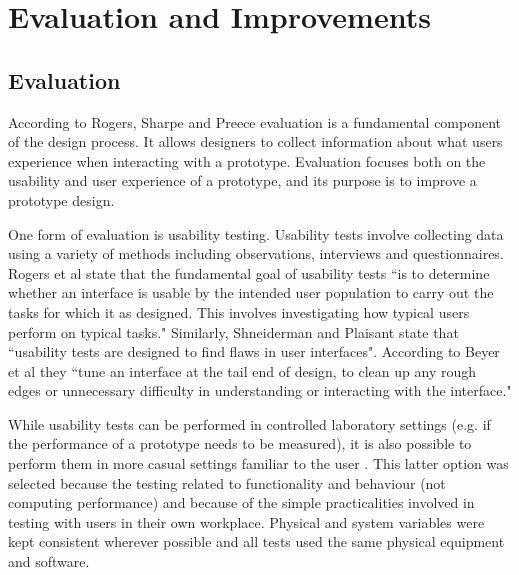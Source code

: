 
\chapter{Evaluation and Improvements} %

\label{Evaluation and Improvements} %



\section{Evaluation}
According to Rogers, Sharpe and Preece \citep[p. 433]{RogersPreece} evaluation is a fundamental component of the design process. It allows designers to collect information about what users experience when interacting with a prototype. Evaluation focuses both on the usability and user experience of a prototype, and its purpose is to improve a prototype design.

One form of evaluation is usability testing. Usability tests involve collecting data using a variety of methods including observations, interviews and questionnaires. Rogers et al \citep[p. 438]{RogersPreece}  state that the fundamental goal of usability tests ``is to determine whether an interface is usable by the intended user population to carry out the tasks for which it as designed. This involves investigating how typical users perform on typical tasks." Similarly, Shneiderman and Plaisant \citep[p. 144]{ShneidermanPlaisant} state that ``usability tests are designed to find flaws in user interfaces". According to Beyer et al \citep[p. 373]{BeyerHoltzblatt} they ``tune an interface at the tail end of design, to clean up any rough edges or unnecessary difficulty in understanding or interacting with the interface."

While usability tests can be performed in controlled laboratory settings (e.g. if the performance of a prototype needs to be measured), it is also possible to perform them in more casual settings familiar to the user \citep[p. 438]{RogersPreece}. This latter option was selected because the testing related to functionality and behaviour (not computing performance) and because of the simple practicalities involved in testing with users in their own workplace. Physical and system variables were kept consistent wherever possible and all tests used the same physical equipment and software. 

